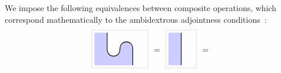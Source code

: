 \documentclass[a4paper,12pt]{article}
\theoremstyle{definition}
\renewcommand{\-}[0]{\nobreakdash-\hspace{0pt}}
\def\syntaxfill{blue!20}
\def\innerboxsep{3pt}
\begin{document}
\noindent
We impose the following equivalences between composite operations, which correspond mathematically to the ambidextrous adjointness conditions~\citep{l06-faaa}:
\def\innerboxsep{8pt}
\def\compactwidthscale{0.55}
\def\compactheightscale{0.7}
\def\drawspecialboxA{    \draw [black!20]
        ([xshift=-\compactheightscale*\innerboxsep, yshift=-\compactwidthscale*\innerboxsep] -3,0)
        rectangle
        ([xshift=\compactheightscale*\innerboxsep, yshift=\compactwidthscale*\innerboxsep] 1,2);}
\def\drawspecialboxB{    \draw [black!20]
        ([xshift=-\compactheightscale*\innerboxsep, yshift=-\compactwidthscale*\innerboxsep] -1,0)
        rectangle
        ([xshift=\compactheightscale*\innerboxsep, yshift=\compactwidthscale*\innerboxsep] 1,2);}
\begin{gather}
\label{eq:top1}
\begin{aligned}
\begin{tikzpicture}[xscale=\compactwidthscale, yscale=\compactheightscale]
\node (a) at (0,0) [inner sep=0pt] {};
\node (b) at (0,1) [inner sep=0pt] {};
\node (c) at (-1,1) {};
\node (d) at (-2,1) {};
\node (e) at (-2,2) [inner sep=0pt] {};
\draw [fill=\syntaxfill, draw=none] (a.center)
    to (b.center)
    to [out=up, in=up, looseness=1.5] (c.center)
    to [out=down, in=down, looseness=1.5] (d.center)
    to (e.center)
    to (-3,2) to (-3,0) to (0,0);
\draw [thick] (a.center)
    to (b.center)
    to [out=up, in=up, looseness=1.5] (c.center)
    to [out=down, in=down, looseness=1.5] (d.center)
    to (e.center);
\draw [white] (1,0) to (1,1);
\drawspecialboxA
\end{tikzpicture}
\end{aligned}
\hspace{4pt}
=
\hspace{4pt}
\begin{aligned}
\begin{tikzpicture}[xscale=\compactwidthscale, yscale=\compactheightscale]
\node (a) at (0,0) {};
\node (e) at (0,2) {};
\draw [fill=\syntaxfill, draw=none] (a.center)
    to (e.center)
    to (-1,2) to (-1,0) to (0,0);
\draw [thick] (a.center)
    to (e.center);
\draw [white] (1,0) to (1,1);
\drawspecialboxB
\end{tikzpicture}
\end{aligned}
\hspace{4pt}
=
\hspace{4pt}
\begin{aligned}
\begin{tikzpicture}[xscale=\compactwidthscale, yscale=-\compactheightscale]

\end{tikzpicture}
\end{aligned}
\end{gather}
\end{document}
